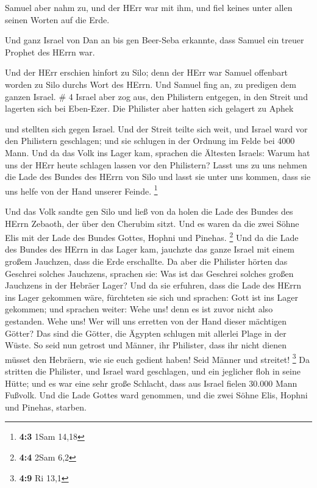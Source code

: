  Samuel aber nahm zu, und der HErr war mit ihm, und fiel
keines unter allen seinen Worten auf die Erde.

 Und ganz Israel von Dan an bis gen Beer-Seba erkannte,
dass Samuel ein treuer Prophet des HErrn war.

 Und der HErr erschien hinfort zu Silo; denn der HErr war
Samuel offenbart worden zu Silo durchs Wort des HErrn. Und Samuel fing
an, zu predigen dem ganzen Israel. \# 4  Israel aber zog
aus, den Philistern entgegen, in den Streit und lagerten sich bei
Eben-Ezer. Die Philister aber hatten sich gelagert zu Aphek

 und stellten sich gegen Israel. Und der Streit teilte sich
weit, und Israel ward vor den Philistern geschlagen; und sie schlugen in
der Ordnung im Felde bei 4000 Mann.  Und da das Volk ins
Lager kam, sprachen die Ältesten Israels: Warum hat uns der HErr heute
schlagen lassen vor den Philistern? Lasst uns zu uns nehmen die Lade des
Bundes des HErrn von Silo und lasst sie unter uns kommen, dass sie uns
helfe von der Hand unserer Feinde. \footnote{\textbf{4:3} 1Sam 14,18}

 Und das Volk sandte gen Silo und ließ von da holen die Lade
des Bundes des HErrn Zebaoth, der über den Cherubim sitzt. Und es waren
da die zwei Söhne Elis mit der Lade des Bundes Gottes, Hophni und
Pinehas. \footnote{\textbf{4:4} 2Sam 6,2}  Und da die Lade
des Bundes des HErrn in das Lager kam, jauchzte das ganze Israel mit
einem großem Jauchzen, dass die Erde erschallte.  Da aber
die Philister hörten das Geschrei solches Jauchzens, sprachen sie: Was
ist das Geschrei solches großen Jauchzens in der Hebräer Lager? Und da
sie erfuhren, dass die Lade des HErrn ins Lager gekommen wäre,
 fürchteten sie sich und sprachen: Gott ist ins Lager
gekommen; und sprachen weiter: Wehe uns! denn es ist zuvor nicht also
gestanden.  Wehe uns! Wer will uns erretten von der Hand
dieser mächtigen Götter? Das sind die Götter, die Ägypten schlugen mit
allerlei Plage in der Wüste.  So seid nun getrost und
Männer, ihr Philister, dass ihr nicht dienen müsset den Hebräern, wie
sie euch gedient haben! Seid Männer und streitet! \footnote{\textbf{4:9}
  Ri 13,1}  Da stritten die Philister, und Israel ward
geschlagen, und ein jeglicher floh in seine Hütte; und es war eine sehr
große Schlacht, dass aus Israel fielen 30.000 Mann Fußvolk.
 Und die Lade Gottes ward genommen, und die zwei Söhne
Elis, Hophni und Pinehas, starben.

